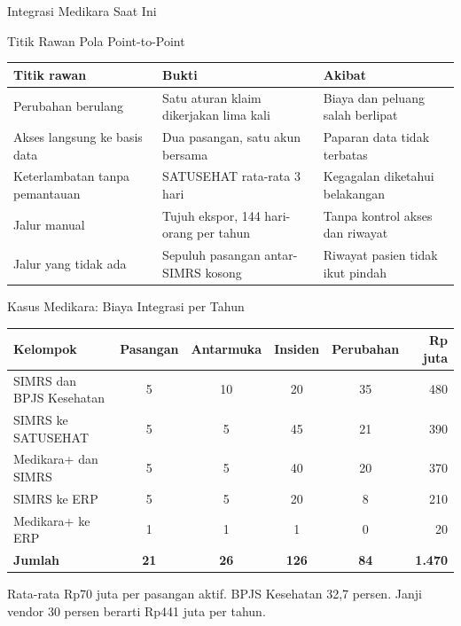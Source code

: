 \documentclass[aspectratio=169, table, 12pt]{beamer}
\begin{document}
\begin{frame}{{\Large Integrasi Medikara Saat Ini}}
  \centering
\end{frame}

\begin{frame}{{\Large Titik Rawan Pola Point-to-Point}}
  \footnotesize
  \begin{tabularx}{\textwidth}{>{\raggedright\arraybackslash}p{4.0cm}>{\raggedright\arraybackslash}X>{\raggedright\arraybackslash}X}
    \hline
    \textbf{Titik rawan} & \textbf{Bukti} & \textbf{Akibat} \\
    \hline
    Perubahan berulang & Satu aturan klaim dikerjakan lima kali & Biaya dan peluang salah berlipat \\
    \hline
    Akses langsung ke basis data & Dua pasangan, satu akun bersama & Paparan data tidak terbatas \\
    \hline
    Keterlambatan tanpa pemantauan & SATUSEHAT rata-rata 3 hari & Kegagalan diketahui belakangan \\
    \hline
    Jalur manual & Tujuh ekspor, 144 hari-orang per tahun & Tanpa kontrol akses dan riwayat \\
    \hline
    Jalur yang tidak ada & Sepuluh pasangan antar-SIMRS kosong & Riwayat pasien tidak ikut pindah \\
    \hline
  \end{tabularx}
\end{frame}

\begin{frame}{{\Large Kasus Medikara: Biaya Integrasi per Tahun}}
  \footnotesize
  \begin{tabularx}{\textwidth}{>{\raggedright\arraybackslash}Xccccr}
    \hline
    \textbf{Kelompok} & \textbf{Pasangan} & \textbf{Antarmuka} & \textbf{Insiden} & \textbf{Perubahan} & \textbf{Rp juta} \\
    \hline
    SIMRS dan BPJS Kesehatan & 5 & 10 & 20 & 35 & 480 \\
    \hline
    SIMRS ke SATUSEHAT & 5 & 5 & 45 & 21 & 390 \\
    \hline
    Medikara+ dan SIMRS & 5 & 5 & 40 & 20 & 370 \\
    \hline
    SIMRS ke ERP & 5 & 5 & 20 & 8 & 210 \\
    \hline
    Medikara+ ke ERP & 1 & 1 & 1 & 0 & 20 \\
    \hline
    \textbf{Jumlah} & \textbf{21} & \textbf{26} & \textbf{126} & \textbf{84} & \textbf{1.470} \\
    \hline
  \end{tabularx}

  \vspace{6pt}
  \small Rata-rata Rp70 juta per pasangan aktif. BPJS Kesehatan 32,7 persen. Janji vendor 30 persen berarti Rp441 juta per tahun.
\end{frame}
\end{document}
